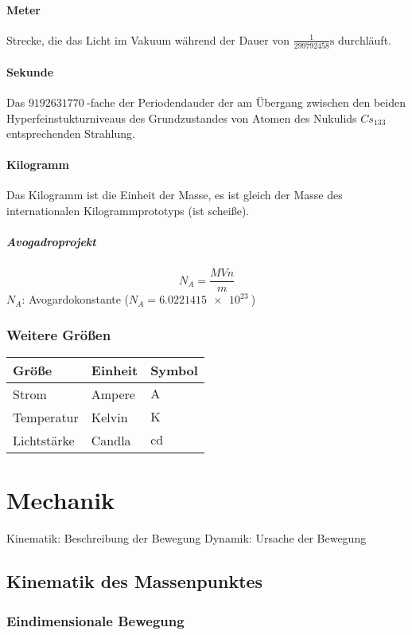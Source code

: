 \documentclass[a4paper]{scrartcl}
\theoremstyle{definition}
\theoremstyle{plain}
\theoremstyle{plain}
\theoremstyle{remark}
\theoremstyle{remark}
\theoremstyle{remark}
\begin{document}
\paragraph{Meter}
\label{sec-1-2-1-1}
Strecke, die das Licht im Vakuum während der Dauer von $\frac{1}{299792458}\si{\second}$ durchläuft.
\paragraph{Sekunde}
\label{sec-1-2-1-2}
Das $\SI{9192631770}{}$-fache  der Periodendauder der am Übergang zwischen den beiden Hyperfeinstukturniveaus des Grundzustandes von Atomen des Nukulids $Cs_{133}$ entsprechenden Strahlung.
\paragraph{Kilogramm}
\label{sec-1-2-1-3}
Das Kilogramm ist die Einheit der Masse, es ist gleich der Masse des internationalen Kilogrammprototyps (ist scheiße).
\subparagraph{Avogadroprojekt}
\label{sec-1-2-1-3-1}
\[N_A = \frac{M V n}{m}\]
$N_A$: Avogardokonstante ($N_A = \SI{6.0221415e23}{}$)
\subsubsection{Weitere Größen}
\label{sec-1-2-2}
\begin{center}
\begin{tabular}{lll}
Größe & Einheit & Symbol\\
\hline
Strom & Ampere & $\si{\ampere}$\\
Temperatur & Kelvin & $\si{\kelvin}$\\
Lichtstärke & Candla & $\si{\candela}$\\
\end{tabular}
\end{center}
\section{Mechanik}
\label{sec-2}
Kinematik: Beschreibung der Bewegung
Dynamik: Ursache der Bewegung

\subsection{Kinematik des Massenpunktes}
\label{sec-2-1}
\subsubsection{Eindimensionale Bewegung}
\label{sec-2-1-1}
\end{document}
